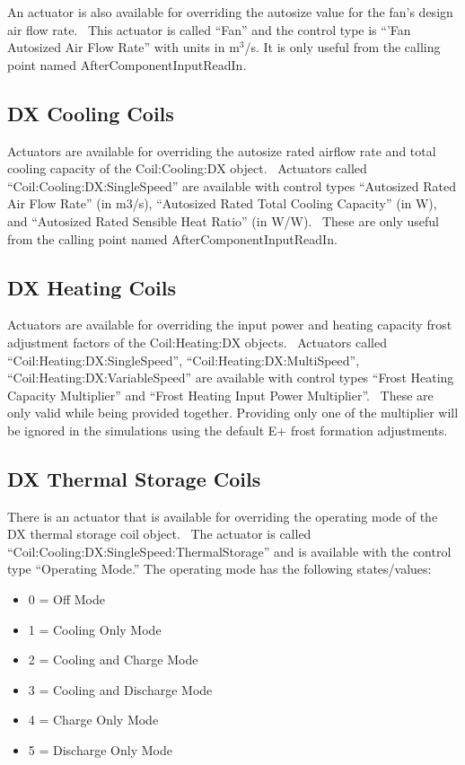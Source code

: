 An actuator is also available for overriding the autosize value for the fan's design air flow rate.~ This actuator is called ``Fan'' and the control type is ``'Fan Autosized Air Flow Rate'' with units in m\(^{3}\)/s. It is only useful from the calling point named AfterComponentInputReadIn.

\subsection{DX Cooling Coils}\label{dx-cooling-coils}

Actuators are available for overriding the autosize rated airflow rate and total cooling capacity of the Coil:Cooling:DX object.~ Actuators called ``Coil:Cooling:DX:SingleSpeed'' are available with control types ``Autosized Rated Air Flow Rate'' (in m3/s), ``Autosized Rated Total Cooling Capacity'' (in W), and ``Autosized Rated Sensible Heat Ratio'' (in W/W).~ These are only useful from the calling point named AfterComponentInputReadIn.

\subsection{DX Heating Coils}\label{dx-heating-coils}

Actuators are available for overriding the input power and heating capacity frost adjustment factors of the Coil:Heating:DX objects.~ Actuators called ``Coil:Heating:DX:SingleSpeed'', ``Coil:Heating:DX:MultiSpeed'', ``Coil:Heating:DX:VariableSpeed'' are available with control types ``Frost Heating Capacity Multiplier'' and ``Frost Heating Input Power Multiplier''.~ These are only valid while being provided together. Providing only one of the multiplier will be ignored in the simulations using the default E+ frost formation adjustments.

\subsection{DX Thermal Storage Coils}\label{dx-thermal-storage-coils}

There is an actuator that is available for overriding the operating mode of the DX thermal storage coil object.~ The actuator is called ``Coil:Cooling:DX:SingleSpeed:ThermalStorage'' and is available with the control type ``Operating Mode.''  The operating mode has the following states/values:

\begin{itemize}
\item
0 = Off Mode
\item
1 = Cooling Only Mode
\item
2 = Cooling and Charge Mode
\item
3 = Cooling and Discharge Mode
\item
4 = Charge Only Mode
\item
5 = Discharge Only Mode
\end{itemize}


